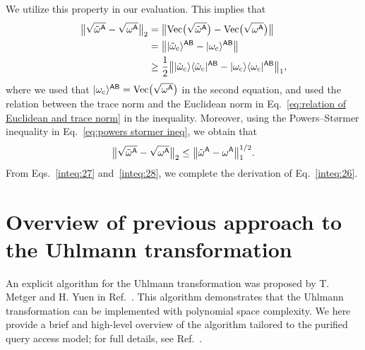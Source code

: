We utilize this property in our evaluation. This implies that
\begin{align}
    \big\|\sqrt{\tilde{\omega}^{\mathsf{A}}} - \sqrt{\omega^{\mathsf{A}}}\big\|_2 
    &= \big\|\mathrm{Vec}\big(\sqrt{\tilde{\omega}^{\mathsf{A}}}\big) - \mathrm{Vec}\big(\sqrt{\omega^{\mathsf{A}}}\big)\big\|\\
    &= \big\||\tilde{\omega}_{\rm c}\rangle^{{\mathsf{A}}{\mathsf{B}}} - |\omega_{\rm c}\rangle^{{\mathsf{A}}{\mathsf{B}}}\big\| \\
    \label{inteq:27}
    &\geq \frac{1}{2}\big\||\tilde{\omega}_{\rm c}\rangle\langle\tilde{\omega}_{\rm c}|^{{\mathsf{A}}{\mathsf{B}}} - |\omega_{\rm c}\rangle\langle\omega_{\rm c}|^{{\mathsf{A}}{\mathsf{B}}}\big\|_1,
\end{align}
where we used that $|\omega_{\rm c}\rangle^{{\mathsf{A}}{\mathsf{B}}} = \mathrm{Vec}\big(\sqrt{\omega^{\mathsf{A}}}\big)$ in the second equation, and used the relation between the trace norm and the Euclidean norm in Eq.~\eqref{eq:relation of Euclidean and trace norm} in the inequality.
Moreover, using the Powers--St\o rmer inequality in Eq.~\eqref{eq:powers stormer ineq}, we obtain that
\begin{align}
\label{inteq:28}
    \big\|\sqrt{\tilde{\omega}^{\mathsf{A}}} - \sqrt{\omega^{\mathsf{A}}}\big\|_2 \leq \big\|\tilde{\omega}^{\mathsf{A}} - \omega^{\mathsf{A}}\big\|_1^{1/2}.
\end{align}
From Eqs.~\eqref{inteq:27} and~\eqref{inteq:28}, we complete the derivation of Eq.~\eqref{inteq:26}.
















\section{Overview of previous approach to the Uhlmann transformation}
\label{sec:metger and yuen's algorithm}

An explicit algorithm for the Uhlmann transformation was proposed by T. Metger and H. Yuen in Ref.~\cite{metger2023stateqipspace}.
This algorithm demonstrates that the Uhlmann transformation can be implemented with polynomial space complexity.
We here provide a brief and high-level overview of the algorithm tailored to the purified query access model; for full details, see Ref.~\cite{metger2023stateqipspace}.





